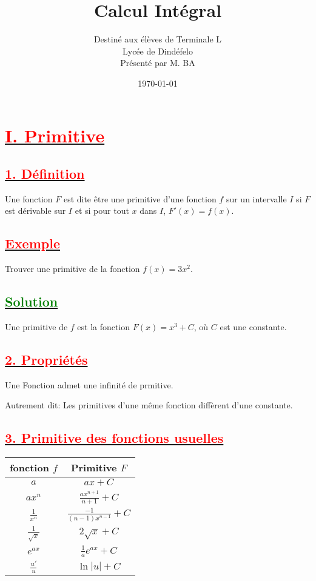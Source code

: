 \documentclass[12pt]{article}
\author{Destiné aux élèves de Terminale L\\Lycée de Dindéfelo\\Présenté par M. BA}
\title{\textbf{Calcul Intégral}}
\date{\today}
\begin{document}
\maketitle
\newpage

\section*{\underline{\textbf{\textcolor{red}{I. Primitive}}}}

\subsection*{\underline{\textbf{\textcolor{red}{1. Définition}}}}
Une fonction $F$ est dite être une primitive d'une fonction $f$ sur un intervalle $I$ si $F$ est dérivable sur $I$ et si pour tout $x$ dans $I$, $F'(x) = f(x)$.

\subsection*{\underline{\textbf{\textcolor{red}{Exemple}}}}
Trouver une primitive de la fonction $f(x) = 3x^2$.

\subsection*{\underline{\textbf{\textcolor{green}{Solution}}}}
Une primitive de $f$ est la fonction $F(x) = x^3 + C$, où $C$ est une constante.

\subsection*{\underline{\textbf{\textcolor{red}{2. Propriétés}}}}
Une Fonction admet une infinité de prmitive.

Autrement dit: Les primitives d'une même fonction diffèrent d'une constante.
\subsection*{\underline{\textbf{\textcolor{red}{3. Primitive des fonctions usuelles}}}}
\begin{table}[h]
\centering
\begin{tabular}{|c|c|}
\hline
fonction \(f\) & Primitive \(F\) \\ \hline
\(a\) & \(ax + C\) \\ \hline
\(ax^{n}\) & \(\frac{ax^{n+1}}{n+1} + C\) \\ \hline
\(\frac{1}{x^{n}}\) & \(\frac{-1}{(n-1)x^{n-1}} + C\) \\ \hline
\(\frac{1}{\sqrt{x}}\) & \(2\sqrt{x} + C\) \\ \hline
\(e^{ax}\) & \(\frac{1}{a}e^{ax} + C\) \\ \hline
\(\frac{u'}{u}\) & \(\ln |u| + C\) \\ \hline
\end{tabular}
\end{table}
\end{document}
